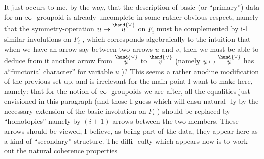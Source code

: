It just occurs to me, by the way, that the  description of basic (or
``primary'') data for an $\infty$- groupoid is already uncomplete in some rather
obvious respect, namely that the symmetry-operation  $u \mapsto \overset{\hand{\vee}}{u}$ on $F_i$ must
be complemented by i-1 similar involutions on $F_i$ , which corresponds
algebraically to the intuition that when we have an  arrow \hand{$\lambda$} say between
two  arrows $u$ and $v$, then we must be able to deduce from it another arrow
from $\overset{\hand{\vee}}{u}$ to $\overset{\hand{\vee}}{v}$ (namely $u \mapsto \overset{\hand{\vee}}{u}$ has a``functorial character'' for variable
$u$ )? This seems a rather anodine modification of the previous set-up,
and is irrelevant for the main point I want to make here, namely: that
for the notion of $\infty$ -groupoids we are after, all the equalities just
envisioned in this paragraph (and those I guess which will ensu natural-%
ly by the necessary extension of the basic involution on $F_i$ ) should be
replaced by ``homotopies''\hand{,} namely by $(i+1)$-arrows between the two members.
These arrows should be viewed, I believe, as being part of the data, 
 they appear here as a kind of ``secondary'' structure. The diffi-%
culty which appears now is to work out the natural coherence properties

